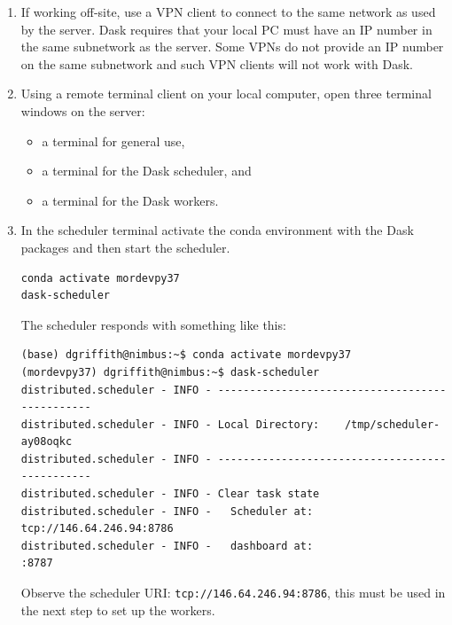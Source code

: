 \begin{enumerate}
\item If working off-site, use a VPN client to connect to the same network as used by the server.  Dask requires that your local PC must have an IP number in the same subnetwork as the server.  Some VPNs do not provide an IP number on the same subnetwork and such VPN clients will not work with Dask.
\item Using a remote terminal client on your local computer, open three terminal windows on the server:

\begin{itemize}
\item a  terminal for general use,
\item a terminal for the Dask scheduler, and
\item a terminal for the Dask workers.
\end{itemize}
\item In the scheduler terminal activate the conda environment with the Dask packages and then start the scheduler.

\begin{lstlisting}
conda activate mordevpy37
dask-scheduler
\end{lstlisting}
The scheduler responds with something like this:
\begin{lstlisting}[style=tinysize]
(base) dgriffith@nimbus:~$ conda activate mordevpy37        
(mordevpy37) dgriffith@nimbus:~$ dask-scheduler
distributed.scheduler - INFO - -----------------------------------------------
distributed.scheduler - INFO - Local Directory:    /tmp/scheduler-ay08oqkc
distributed.scheduler - INFO - -----------------------------------------------
distributed.scheduler - INFO - Clear task state
distributed.scheduler - INFO -   Scheduler at:  tcp://146.64.246.94:8786
distributed.scheduler - INFO -   dashboard at:                     :8787
\end{lstlisting}
   
Observe the scheduler URI: \lstinline{tcp://146.64.246.94:8786}, this must be used in the next step to set up the workers.


\end{enumerate}
